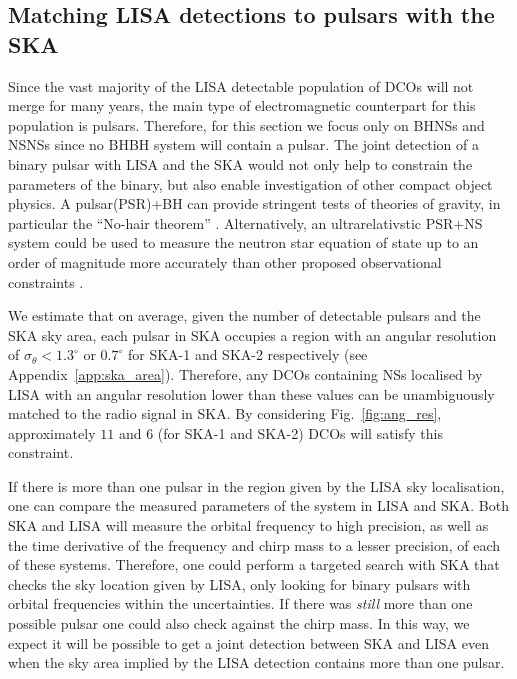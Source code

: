 \subsection{Matching LISA detections to pulsars with the SKA}\label{sec:pulsar_matching}
Since the vast majority of the LISA detectable population of DCOs will not merge for many years, the main type of electromagnetic counterpart for this population is pulsars. Therefore, for this section we focus only on BHNSs and NSNSs since no BHBH system will contain a pulsar. The joint detection of a binary pulsar with LISA and the SKA \citep{Dewdney+2009} would not only help to constrain the parameters of the binary, but also enable investigation of other compact object physics. A pulsar(PSR)+BH can provide stringent tests of theories of gravity, in particular the ``No-hair theorem'' \citep{Keane+2015}. Alternatively, an ultrarelativstic PSR+NS system could be used to measure the neutron star equation of state up to an order of magnitude more accurately than other proposed observational constraints \citep{Kyutoku+2019, Thrane+2020}.

We estimate that on average, given the number of detectable pulsars and the SKA sky area, each pulsar in SKA occupies a region with an angular resolution of $\sigma_{\theta} < 1.3^\circ$ or $0.7^\circ$ for SKA-1 and SKA-2 respectively (see Appendix~\ref{app:ska_area}). Therefore, any DCOs containing NSs localised by LISA with an angular resolution lower than these values can be unambiguously matched to the radio signal in SKA. By considering Fig.~\ref{fig:ang_res}, approximately $11$ and $6$ (for SKA-1 and SKA-2) DCOs will satisfy this constraint.

If there is more than one pulsar in the region given by the LISA sky localisation, one can compare the measured parameters of the system in LISA and SKA. Both SKA and LISA will measure the orbital frequency to high precision, as well as the time derivative of the frequency and chirp mass to a lesser precision, of each of these systems. Therefore, one could perform a targeted search with SKA that checks the sky location given by LISA, only looking for binary pulsars with orbital frequencies within the uncertainties. If there was \textit{still} more than one possible pulsar one could also check against the chirp mass. In this way, we expect it will be possible to get a joint detection between SKA and LISA even when the sky area implied by the LISA detection contains more than one pulsar.


